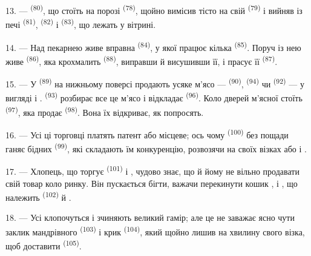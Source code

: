 13. ---  \textsuperscript{(80)}, що стоїть на порозі
 \textsuperscript{(78)}, щойно вимісив тісто на свій
 \textsuperscript{(79)} і вийняв із печі 
\textsuperscript{(81)},  \textsuperscript{(82)} і
 \textsuperscript{(83)}, що лежать у вітрині.

14. --- Над пекарнею живе вправна  \textsuperscript{(84)}, у якої
працює кілька  \textsuperscript{(85)}. Поруч із нею живе
 \textsuperscript{(86)}, яка крохмалить
 \textsuperscript{(88)}, виправши й висушивши її, і прасує її
 \textsuperscript{(87)}.

\VUsaut{4.0mm}
\VUsaut{3.0mm}

15. --- У  \textsuperscript{(89)} на нижньому поверсі
продають усяке м'ясо ---  \textsuperscript{(90)},
 \textsuperscript{(94)} чи 
\textsuperscript{(92)} --- у вигляді  і
.  \textsuperscript{(93)} розбирає
все це м'ясо і відкладає  \textsuperscript{(96)}. Коло
дверей м'ясної стоїть  \textsuperscript{(97)}, яка
продає  \textsuperscript{(98)}. Вона їх відкриває, як попросять.

16. --- Усі ці торговці платять патент або місцеве; ось чому 
\textsuperscript{(100)} без пощади ганяє бідних 
\textsuperscript{(99)}, які складають їм конкуренцію, розвозячи на своїх візках
 або  і .

\VUsaut{4.0mm}
\VUsaut{3.0mm}

17. --- Хлопець, що торгує  \textsuperscript{(101)} і
, чудово знає, що й йому не вільно продавати свій товар коло
ринку. Він пускається бігти, важачи перекинути кошик ,
 і , що належить 
\textsuperscript{(102)}  й .

18. --- Усі клопочуться і зчиняють великий гамір; але це не заважає ясно чути
заклик мандрівного  \textsuperscript{(103)} і крик
 \textsuperscript{(104)}, який щойно лишив на хвилину свого
візка, щоб доставити  \textsuperscript{(105)}.
\VUsaut{6.0mm}
\VUfilet{22mm}
